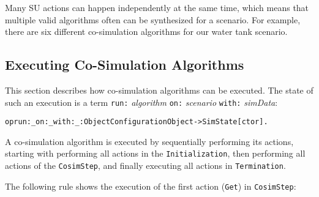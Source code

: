

Many SU actions can happen independently at the same time, which
means that multiple 
valid algorithms often can be synthesized for a scenario. 
%
For example, there are  six different co-simulation algorithms for  our
water tank scenario. 

\subsection{Executing Co-Simulation Algorithms}
This section describes how   co-simulation
algorithms can be executed.
%
The state of such an execution is a term \texttt{run:}
\emph{algorithm} \texttt{on:} \emph{scenario} \texttt{with:}
\emph{simData}:

\small
\begin{alltt}
op run:_on:_with:_ : Object Configuration Object -> SimState [ctor]. 
\end{alltt}
\normalsize

A co-simulation algorithm is executed by sequentially performing its
actions, starting with performing all actions in the
\texttt{Initialization}, then performing all actions of the
\texttt{CosimStep}, and finally executing all  actions in
\texttt{Termination}.  

The following rule shows the execution of the first
action (\texttt{Get}) %
in \texttt{CosimStep}: 

